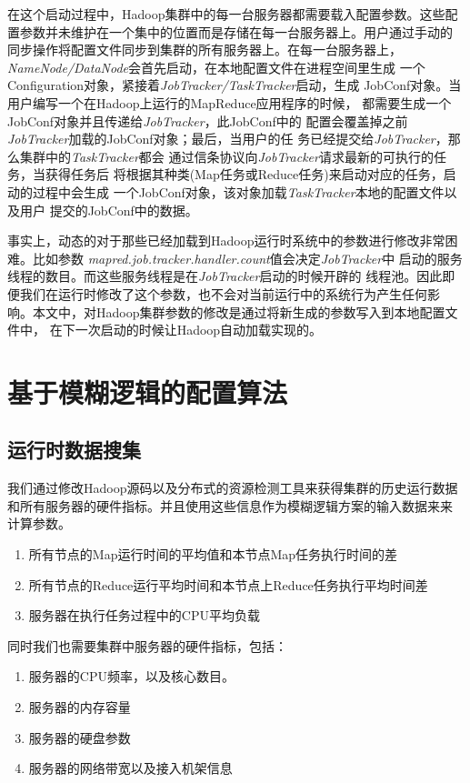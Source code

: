 在这个启动过程中，Hadoop集群中的每一台服务器都需要载入配置参数。这些配
置参数并未维护在一个集中的位置而是存储在每一台服务器上。用户通过手动的
同步操作将配置文件同步到集群的所有服务器上。在每一台服务器上，
\textit{NameNode/DataNode}会首先启动，在本地配置文件在进程空间里生成
一个Configuration对象，紧接着\textit{JobTracker/TaskTracker}启动，生成
JobConf对象。当用户编写一个在Hadoop上运行的MapReduce应用程序的时候，
都需要生成一个JobConf对象并且传递给\textit{JobTracker}，此JobConf中的
配置会覆盖掉之前\textit{JobTracker}加载的JobConf对象；最后，当用户的任
务已经提交给\textit{JobTracker}，那么集群中的\textit{TaskTracker}都会
通过信条协议向\textit{JobTracker}请求最新的可执行的任务，当获得任务后
将根据其种类(Map任务或Reduce任务)来启动对应的任务，启动的过程中会生成
一个JobConf对象，该对象加载\textit{TaskTracker}本地的配置文件以及用户
提交的JobConf中的数据。

事实上，动态的对于那些已经加载到Hadoop运行时系统中的参数进行修改非常困难。比如参数
\textit{mapred.job.tracker.handler.count}值会决定\textit{JobTracker}中
启动的服务线程的数目。而这些服务线程是在\textit{JobTracker}启动的时候开辟的
线程池。因此即便我们在运行时修改了这个参数，也不会对当前运行中的系统行为产生任何影
响。本文中，对Hadoop集群参数的修改是通过将新生成的参数写入到本地配置文件中，
在下一次启动的时候让Hadoop自动加载实现的。

\section{基于模糊逻辑的配置算法}

\subsection{运行时数据搜集}
我们通过修改Hadoop源码以及分布式的资源检测工具来获得集群的历史运行数据
和所有服务器的硬件指标。并且使用这些信息作为模糊逻辑方案的输入数据来来
计算参数。

\begin{enumerate}
\item 所有节点的Map运行时间的平均值和本节点Map任务执行时间的差
\item 所有节点的Reduce运行平均时间和本节点上Reduce任务执行平均时间差
\item 服务器在执行任务过程中的CPU平均负载
\end{enumerate}

同时我们也需要集群中服务器的硬件指标，包括：
\begin{enumerate}
\item 服务器的CPU频率，以及核心数目。
\item 服务器的内存容量
\item 服务器的硬盘参数
\item 服务器的网络带宽以及接入机架信息
\end{enumerate}
    
